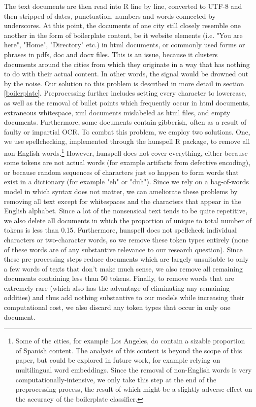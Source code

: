 \documentclass[11pt]{article}
\begin{document}
The text documents are then read into R line by line, converted to UTF-8 and then stripped of dates, punctuation, numbers and words connected by underscores. At this point, the documents of one city still closely resemble one another in the form of boilerplate content, be it website elements (i.e. "You are here", "Home", "Directory" etc.) in html documents, or commonly used forms or phrases in pdfs, doc and docx files. This is an issue, because it clusters documents around the cities from which they originate in a way that has nothing to do with their actual content. In other words, the signal would be drowned out by the noise. Our solution to this problem is described in more detail in section \ref{boilerplate}.
Preprocessing further includes setting every character to lowercase, as well as the removal of bullet points which frequently occur in html documents, extraneous whitespace, xml documents mislabeled as html files, and empty documents. Furthermore, some documents contain gibberish, often as a result of faulty or impartial OCR. To combat this problem, we employ two solutions. One, we use spellchecking, implemented through the hunspell R package, to remove all non-English words.\footnote{Some of the cities, for example Los Angeles, do contain a sizable proportion of Spanish content. The analysis of this content is beyond the scope of this paper, but could be explored in future work, for example relying on multilingual word embeddings. Since the removal of non-English words is very computationally-intensive, we only take this step at the end of the preprocessing process, the result of which might be a slightly adverse effect on the accuracy of the boilerplate classifier.} However, hunspell does not cover everything, either because some tokens are not actual words (for example artifacts from defective encoding), or because random sequences of characters just so happen to form words that exist in a dictionary (for example "eh" or "duh"). Since we rely on a bag-of-words model in which syntax does not matter, we can ameliorate these problems by removing all text except for whitespaces and the characters that appear in the English alphabet. Since a lot of the nonsensical text tends to be quite repetitive, we also delete all documents in which the proportion of unique to total number of tokens is less than 0.15. Furthermore, hunspell does not spellcheck individual characters or two-character words, so we remove these token types entirely (none of these words are of any substantive relevance to our research question). Since these pre-processing steps reduce documents which are largely unsuitable to only a few words of texts that don't make much sense, we also remove all remaining documents containing less than 50 tokens. Finally, to remove words that are extremely rare (which also has the advantage of eliminating any remaining oddities) and thus add nothing substantive to our models while increasing their computational cost, we also discard any token types that occur in only one document.
\end{document}
